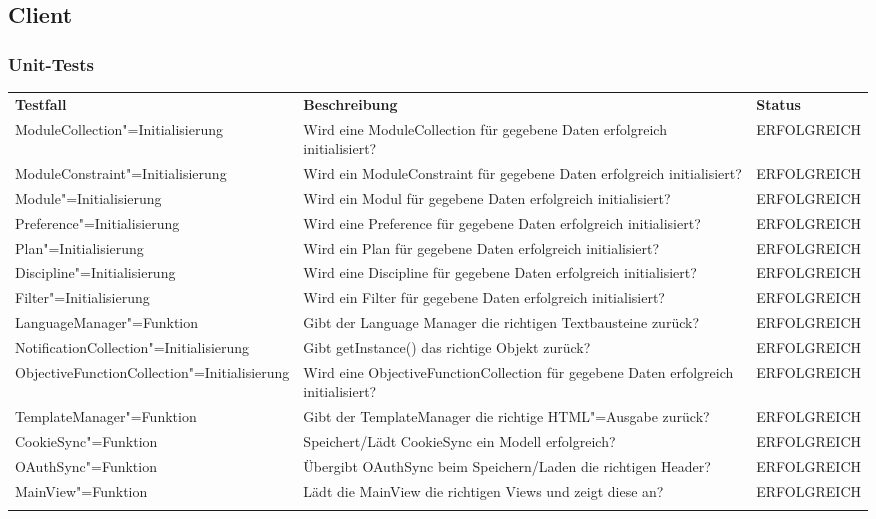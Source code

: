 \FloatBarrier
\subsection{Client}
\subsubsection*{Unit-Tests}
\begin{longtable}{| >{\hspace{0pt}} p{} | >{\hspace{0pt}} p{} | >{\hspace{0pt}} p{} |}
	\hline
	\textbf{Testfall} & \textbf{Beschreibung} & \textbf{Status} \\ 
	\hhline{|=|=|=|}  
	\endfirsthead
	\endhead
	
	ModuleCollection"=Initialisierung & Wird eine ModuleCollection für gegebene Daten erfolgreich initialisiert?  & ERFOLGREICH \\ \hline
	ModuleConstraint"=Initialisierung & Wird ein ModuleConstraint für gegebene Daten erfolgreich initialisiert? & ERFOLGREICH \\ \hline
	Module"=Initialisierung & Wird ein Modul für gegebene Daten erfolgreich initialisiert? & ERFOLGREICH \\ \hline
	Preference"=Initialisierung & Wird eine Preference für gegebene Daten erfolgreich initialisiert? & ERFOLGREICH \\ \hline
	Plan"=Initialisierung & Wird ein Plan für gegebene Daten erfolgreich initialisiert? & ERFOLGREICH \\ \hline
	Discipline"=Initialisierung & Wird eine Discipline für gegebene Daten erfolgreich initialisiert? & ERFOLGREICH \\ \hline
	Filter"=Initialisierung & Wird ein Filter für gegebene Daten erfolgreich initialisiert? & ERFOLGREICH \\ \hline
	LanguageManager"=Funktion & Gibt der Language Manager die richtigen Textbausteine zurück? & ERFOLGREICH \\ \hline
	NotificationCollection"=Initialisierung & Gibt getInstance() das richtige Objekt zurück? & ERFOLGREICH \\ \hline
	ObjectiveFunctionCollection"=Initialisierung & Wird eine ObjectiveFunctionCollection für gegebene Daten erfolgreich initialisiert? & ERFOLGREICH \\ \hline
	TemplateManager"=Funktion & Gibt der TemplateManager die richtige HTML"=Ausgabe zurück? & ERFOLGREICH \\ \hline
	CookieSync"=Funktion & Speichert/Lädt CookieSync ein Modell erfolgreich? & ERFOLGREICH \\ \hline
	OAuthSync"=Funktion & Übergibt OAuthSync beim Speichern/Laden die richtigen Header? & ERFOLGREICH \\ \hline
	MainView"=Funktion & Lädt die MainView die richtigen Views und zeigt diese an? & ERFOLGREICH \\	 
	\hhline{|=|=|=|}   
\end{longtable}

